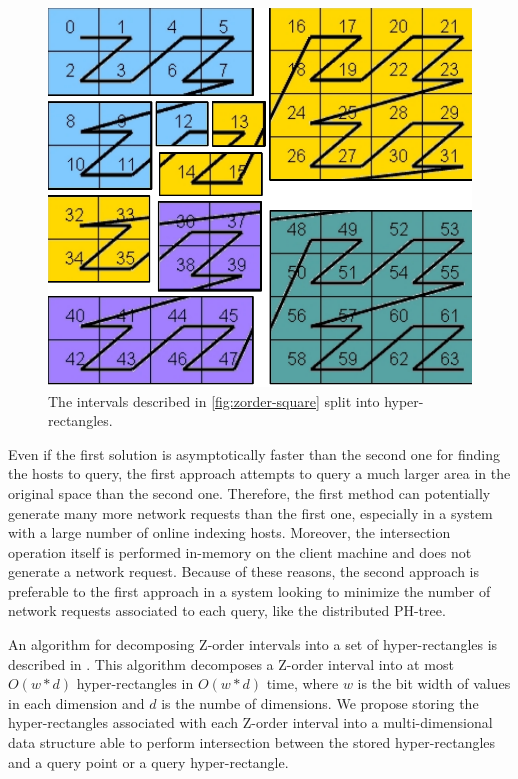 \documentclass[11pt,a4paper]{globis-book}
\begin{document}
\begin{figure}
    \centering
    \includegraphics[scale=0.5]{images/zorder-rectangles.pdf}
    \caption{The intervals described in \ref{fig:zorder-square} split into hyper-rectangles. }
    \label{fig:zorder-rectangles-split}
\end{figure}
Even if the first solution is asymptotically faster than the second one for finding the hosts to query, the first approach attempts to query a much larger area in the original space than the second one. Therefore, the first method can potentially generate many more network requests than the first one, especially in a system with a large number of online indexing hosts. Moreover, the intersection operation itself is performed in-memory on the client machine and does not generate a network request. Because of these reasons, the second approach is preferable to the first approach in a system looking to minimize the number of network requests associated to each query, like the distributed PH-tree. 

An algorithm for decomposing Z-order intervals into a set of hyper-rectangles is described in \cite{skopal2006-ubtree}. This algorithm decomposes a Z-order interval into at most $O(w * d)$ hyper-rectangles in $O(w * d)$ time, where $w$ is the bit width of values in each dimension and $d$ is the numbe of dimensions. We propose storing the hyper-rectangles associated with each Z-order interval into a multi-dimensional data structure able to perform intersection between the stored hyper-rectangles and a query point or a query hyper-rectangle.
\end{document}
